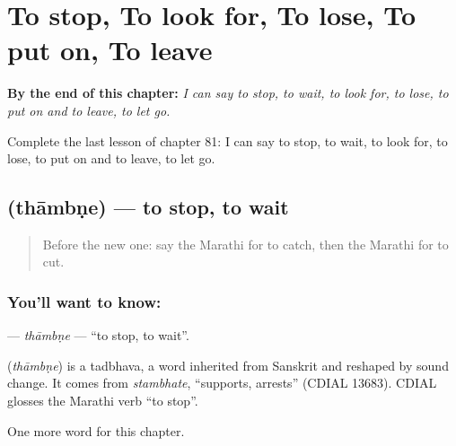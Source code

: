 
\chapter{To stop, To look for, To lose, To put on, To leave}
\label{ch:mr-to-stop-to-look-for-to-lose-to-put-on-to-leave}

\begin{chapteropening}
\textbf{By the end of this chapter:} \emph{I can say to stop, to wait, to look for, to lose, to put on and to leave, to let go.}

Complete the last lesson of chapter 81: I can say to stop, to wait, to look for, to lose, to put on and to leave, to let go.
\end{chapteropening}

\section[\texorpdfstring{\mr{थांबणे} (thāmbṇe)}{थांबणे (thāmbṇe)}]{ (thāmbṇe) — to stop, to wait}

\label{lesson:MR-C81-thambne}



\begin{quote}
Before the new one: say the Marathi for to catch, then the Marathi for to cut.
\end{quote}

\subsection*{You'll want to know: }
\textbf{} — \emph{thāmbṇe} — \textquotedblleft{}to stop, to wait\textquotedblright{}.

\begin{cousinweb}
\textbf{} (\emph{thāmbṇe}) is a tadbhava, a word inherited from Sanskrit and reshaped by sound change. It comes from \emph{stambhate}, \textquotedblleft{}supports, arrests\textquotedblright{} (CDIAL 13683). CDIAL glosses the Marathi verb \textquotedblleft{}to stop\textquotedblright{}.
\end{cousinweb}

\begin{grammarlens}[title={What you've built}]
One more word for this chapter.
\end{grammarlens}

